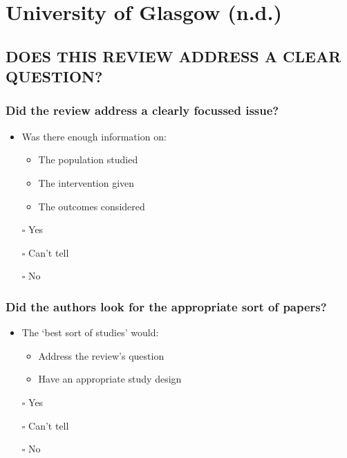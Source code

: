 \documentclass[
  doc, a4paper]{apa7}
\providecommand{\tightlist}{%
  \setlength{\itemsep}{0pt}\setlength{\parskip}{0pt}}
\begin{document}
\section{University of Glasgow (n.d.)}\label{universityofglasgowcriticalappraisalchecklistn.d.nodate}

\subsection{DOES THIS REVIEW ADDRESS A CLEAR QUESTION?}\label{does-this-review-address-a-clear-question}

\subsubsection{Did the review address a clearly focussed issue?}\label{did-the-review-address-a-clearly-focussed-issue}

\begin{itemize}
\tightlist
\item
  Was there enough information on:

  \begin{itemize}
  \tightlist
  \item
    The population studied
  \item
    The intervention given
  \item
    The outcomes considered
  \end{itemize}
\item[$\square$]
  Yes
\item[$\square$]
  Can't tell
\item[$\square$]
  No
\end{itemize}

\subsubsection{Did the authors look for the appropriate sort of papers?}\label{did-the-authors-look-for-the-appropriate-sort-of-papers}

\begin{itemize}
\tightlist
\item
  The `best sort of studies' would:

  \begin{itemize}
  \tightlist
  \item
    Address the review's question
  \item
    Have an appropriate study design
  \end{itemize}
\item[$\square$]
  Yes
\item[$\square$]
  Can't tell
\item[$\square$]
  No
\end{itemize}
\end{document}
